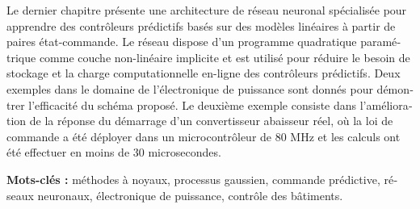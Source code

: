 \begin{otherlanguage}{french}
Le dernier chapitre présente une architecture de réseau neuronal spécialisée pour apprendre des contrôleurs prédictifs basés sur des modèles linéaires à partir de paires état-commande. Le réseau dispose d'un programme quadratique paramétrique comme couche non-linéaire implicite et est utilisé pour réduire le besoin de stockage et la charge computationnelle en-ligne des contrôleurs prédictifs. Deux exemples dans le domaine de l'électronique de puissance sont donnés pour démontrer l'efficacité du schéma proposé. Le deuxième exemple consiste dans l'amélioration de la réponse du démarrage d'un convertisseur abaisseur réel, où la loi de commande a été déployer dans un microcontrôleur de 80 MHz et les calculs ont été effectuer en moins de 30 microsecondes.


\smallbreak
\textbf{Mots-clés :} méthodes à noyaux, processus gaussien, commande prédictive, réseaux neuronaux, électronique de puissance, contrôle des bâtiments.

\end{otherlanguage}


